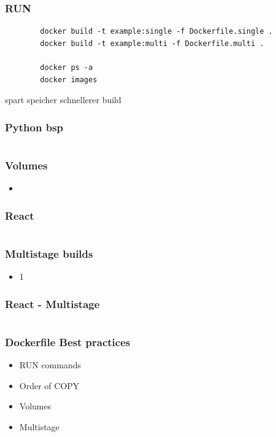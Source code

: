 \documentclass[22pt,handout]{beamer}
\begin{document}
\begin{frame}[fragile]
    \frametitle{RUN}
    \begin{verbatim}
        docker build -t example:single -f Dockerfile.single .
        docker build -t example:multi -f Dockerfile.multi .

        docker ps -a
        docker images
    \end{verbatim}
    spart speicher schnellerer build
\end{frame}

\begin{frame}[fragile]
    \frametitle{Python bsp}
    \inputminted[fontsize=\footnotesize, frame=lines]{dockerfile}{../examples/Dockerfile.cmd}
\end{frame}

\begin{frame}[t]
    \frametitle{Volumes}
    \begin{itemize}
        \item 
    \end{itemize} 
\end{frame}

\begin{frame}[fragile]
    \frametitle{React}
    \inputminted[fontsize=\footnotesize, frame=lines]{dockerfile}{../examples/Dockerfile.cmd}
\end{frame}

\begin{frame}[t]
    \frametitle{Multistage builds}
    \begin{itemize}
        \item 1
    \end{itemize} 
\end{frame}

\begin{frame}[fragile]
    \frametitle{React - Multistage}
    \inputminted[fontsize=\footnotesize, frame=lines]{dockerfile}{../examples/Dockerfile.cmd}
\end{frame}

\begin{frame}[t]
    \frametitle{Dockerfile Best practices}
    \begin{itemize}
        \item RUN commands
        \item Order of COPY
        \item Volumes
        \item Multistage
    \end{itemize} 
\end{frame}
\end{document}
